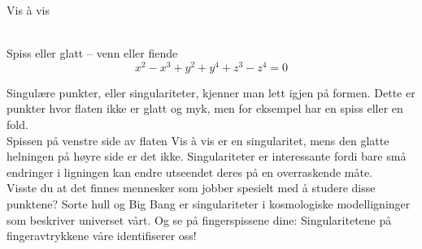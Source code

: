 \documentclass[no]{./../../common/SurferDesc}%
\begin{document}
\footnotesize


\begin{surferPage}
  \begin{surferTitle}Vis \`a vis\end{surferTitle} 
  \\
Spiss eller glatt – venn eller fiende\\
\smallskip
\[x^2	- x^3+ y^2+ y^4+ z^3- z^4	=  0\]

\vspace{0.3cm}
Singulære punkter, eller singulariteter, kjenner man lett igjen på formen. Dette er punkter hvor flaten ikke er glatt og myk, men for eksempel har en spiss eller en fold.\\
\vspace{0.3cm}
Spissen på venstre side av flaten Vis \`a vis er en singularitet, mens den glatte helningen på høyre side er det ikke. Singulariteter er interessante fordi bare små endringer i ligningen kan endre utseendet deres på en overraskende måte.\\

\vspace{0.3cm}
Visste du at det finnes mennesker som jobber spesielt med å studere disse punktene? Sorte hull og Big Bang er singulariteter i kosmologiske modelligninger som beskriver universet vårt. Og se på fingerspissene dine: Singularitetene på fingeravtrykkene våre identifiserer oss!

  \begin{surferText}
     \end{surferText}
\end{surferPage}
\end{document}
